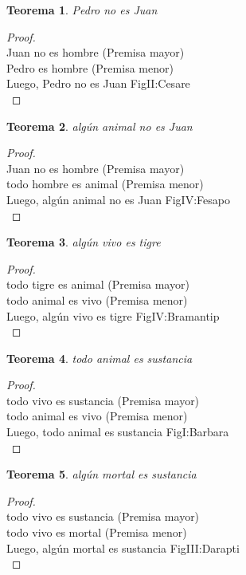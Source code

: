 ﻿\documentclass[12pt]{book}
\newtheorem{theorem}{Teorema}[chapter]
\newtheorem{proof}{Demostración}
\begin{document}
\begin{theorem}
Pedro no es Juan
\label{th: 24}
\end{theorem}\begin{proof}\\Juan no es hombre	 (Premisa mayor) \\Pedro es hombre	 (Premisa menor) \\Luego, Pedro no es Juan	FigII:Cesare \\ \end{proof}
\begin{theorem}
algún animal no es Juan
\label{th: 25}
\end{theorem}\begin{proof}\\Juan no es hombre	 (Premisa mayor) \\todo hombre es animal	 (Premisa menor) \\Luego, algún animal no es Juan	FigIV:Fesapo \\ \end{proof}
\begin{theorem}
algún vivo es tigre
\label{th: 26}
\end{theorem}\begin{proof}\\todo tigre es animal	 (Premisa mayor) \\todo animal es vivo	 (Premisa menor) \\Luego, algún vivo es tigre	FigIV:Bramantip \\ \end{proof}
\begin{theorem}
todo animal es sustancia
\label{th: 27}
\end{theorem}\begin{proof}\\todo vivo es sustancia	 (Premisa mayor) \\todo animal es vivo	 (Premisa menor) \\Luego, todo animal es sustancia	FigI:Barbara \\ \end{proof}
\begin{theorem}
algún mortal es sustancia
\label{th: 28}
\end{theorem}\begin{proof}\\todo vivo es sustancia	 (Premisa mayor) \\todo vivo es mortal	 (Premisa menor) \\Luego, algún mortal es sustancia	FigIII:Darapti \\ \end{proof}
\end{document}
